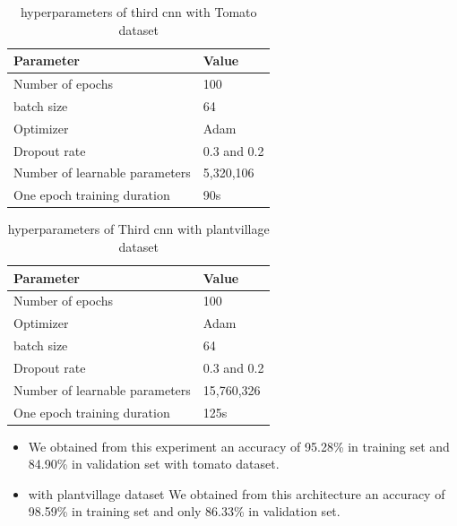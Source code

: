 \begin{table}[H]
\begin{tabular}{@{}|p{9cm}|p{3cm}|@{}}
\hline
 \centering \textbf{Parameter} & \textbf{Value}  \\ \hline
 Number of epochs & 100  \\  \hline
 batch size & 64 \\ \hline
 Optimizer & Adam \\ \hline
 Dropout rate & 0.3 and 0.2 \\ \hline
 Number of learnable parameters & 5,320,106 \\ \hline
 One epoch training duration & 90s \\ \hline
 
\end{tabular}
\caption{hyperparameters of third cnn with Tomato dataset}
\end{table}

\begin{table}[H]
\begin{tabular}{@{}|p{9cm}|p{3cm}|@{}}
\hline
 \centering \textbf{Parameter} & \textbf{Value}  \\ \hline
 Number of epochs & 100  \\  \hline
 Optimizer & Adam \\ \hline
 batch size & 64 \\ \hline
 Dropout rate & 0.3 and 0.2\\ \hline
 Number of learnable parameters & 15,760,326 \\ \hline
 One epoch training duration & 125s \\ \hline
 
\end{tabular}
\caption{hyperparameters of Third cnn with plantvillage dataset}
\end{table}
\begin{itemize}
    \item We obtained from this experiment an accuracy of 95.28\% in training set and 84.90\% in validation set with tomato dataset.
    \item with plantvillage dataset We obtained from this architecture an accuracy of 98.59\% in training set and only 86.33\% in validation set.
\end{itemize}


